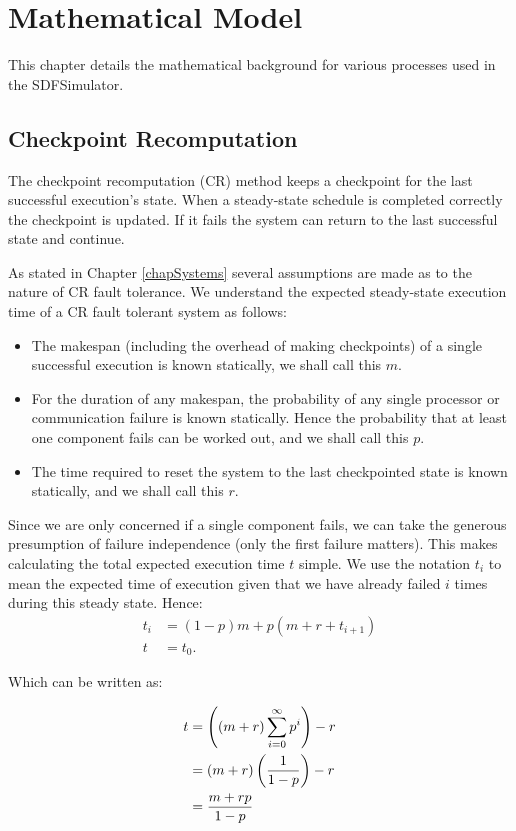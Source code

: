 \chapter{Mathematical Model}
\label{chapModel}

This chapter details the mathematical background for various processes used in the SDFSimulator.

\section{Checkpoint Recomputation}
The checkpoint recomputation (CR) method keeps a checkpoint for the last successful execution's state.
When a steady-state schedule is completed correctly the checkpoint is updated.
If it fails the system can return to the last successful state and continue.

As stated in Chapter \ref{chapSystems} several assumptions are made as to the nature of CR fault tolerance.
We understand the expected steady-state execution time of a CR fault tolerant system as follows:
\begin{itemize}
	\item The makespan (including the overhead of making checkpoints) of a single successful execution is known statically, we shall call this $m$.
	\item For the duration of any makespan, the probability of any single processor or communication failure is known statically.
			Hence the probability that at least one component fails can be worked out, and we shall call this $p$.
	\item The time required to reset the system to the last checkpointed state is known statically, and we shall call this $r$.
\end{itemize}

Since we are only concerned if a single component fails, we can take the generous presumption of failure independence (only the first failure matters).
This makes calculating the total expected execution time $t$ simple.
We use the notation $t_i$ to mean the expected time of execution given that we have already failed $i$ times during this steady state.
Hence:
\begin{align}
	\nonumber t_i & = (1-p)m + p(m + r + t_{i+1}) \\
	\nonumber t & = t_0.
\end{align}

\noindent Which can be written as:

\begin{align}
	\nonumber t & = \left({(m+r)\displaystyle\sum\limits_{i=0}^\infty p^i }\right) - r \\
	\nonumber & = (m+r)\left({{1}\over{1-p}}\right) - r\\
	\nonumber & = {{m+rp}\over{1-p}}
\end{align}

